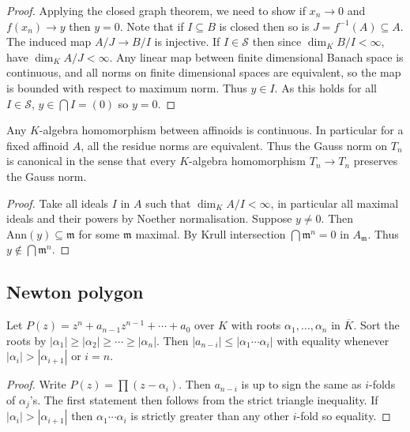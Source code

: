 \documentclass[a4paper]{article}
\begin{document}
\begin{proof}
  Applying the closed graph theorem, we need to show if \(x_n \to 0\) and \(f(x_n) \to y\) then \(y = 0\). Note that if \(I \subseteq B\) is closed then so is \(J = f^{-1}(A) \subseteq A\). The induced map \(A/J \to B/I\) is injective. If \(I \in \mathcal S\) then since \(\dim_K B/I < \infty\), have \(\dim_K A/J < \infty\). Any linear map between finite dimensional Banach space is continuous, and all norms on finite dimensional spaces are equivalent, so the map is bounded with respect to maximum norm. Thus \(y \in I\). As this holds for all \(I \in \mathcal S\), \(y \in \bigcap I = (0)\) so \(y = 0\).
\end{proof}

\begin{corollary}
  Any \(K\)-algebra homomorphism between affinoids is continuous. In particular for a fixed affinoid \(A\), all the residue norms are equivalent. Thus the Gauss norm on \(T_n\) is canonical in the sense that every \(K\)-algebra homomorphism \(T_n \to T_n\) preserves the Gauss norm.
\end{corollary}

\begin{proof}
  Take all ideals \(I\) in \(A\) such that \(\dim_K A/I < \infty\), in particular all maximal ideals and their powers by Noether normalisation. Suppose \(y \ne 0\). Then \(\mathrm{Ann}(y) \subseteq \mathfrak m\) for some \(\mathfrak m\) maximal. By Krull intersection \(\bigcap \mathfrak m^n = 0\) in \(A_{\mathfrak m}\). Thus \(y \notin \bigcap \mathfrak m^n\).
\end{proof}

\subsection{Newton polygon}

\begin{lemma}
  Let \(P(z) = z^n + a_{n - 1}z^{n - 1} + \cdots + a_0\) over \(K\) with roots \(\alpha_1, \dots, \alpha_n\) in \(\overline K\). Sort the roots by \(|\alpha_1| \geq |\alpha_2| \geq \cdots \geq |\alpha_n|\). Then \(|a_{n - i}| \leq |\alpha_1 \cdots \alpha_i|\) with equality whenever \(|\alpha_i| > |\alpha_{i + 1}|\) or \(i = n\).
\end{lemma}

\begin{proof}
  Write \(P(z) = \prod (z - \alpha_i)\). Then \(a_{n - i}\) is up to sign the same as \(i\)-folds of \(\alpha_j\)'s. The first statement then follows from the strict triangle inequality. If \(|\alpha_i| > |\alpha_{i + 1}|\) then \(\alpha_1 \cdots \alpha_i\) is strictly greater than any other \(i\)-fold so equality.
\end{proof}
\end{document}
